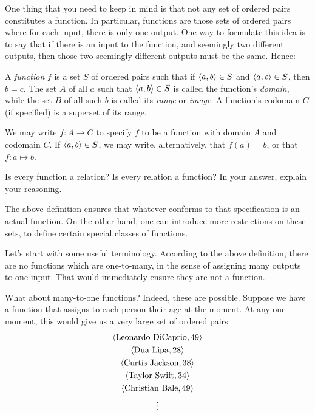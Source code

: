 
One thing that you need to keep in mind is that not any set of ordered pairs constitutes a function. In particular, functions are those sets of ordered pairs where for each input, there is only one output. One way to formulate this idea is to say that if there is an input to the function, and seemingly two different outputs, then those two seemingly different outputs must be the same. Hence:

\begin{defn}[Function] A \emph{function} $f$ is a set $S$ of ordered pairs such that if $\langle a,b\rangle \in S$ and $\langle a, c\rangle \in S$, then $b=c$. The set $A$ of all $a$ such that $\langle a, b\rangle \in S$ is called the function's \emph{domain}, while the set $B$ of all such $b$ is called its \emph{range} or \emph{image}. A function's codomain $C$ (if specified) is a superset of its range. 
	
We may write $f: A \to C$ to specify $f$ to be a function with domain $A$ and codomain $C$. If $\langle a, b\rangle \in S$, we may write, alternatively, that $f(a)=b$, or that $f: a \mapsto b$.   
\end{defn}

\begin{exc}
Is every function a relation? Is every relation a function? In your answer, explain your reasoning. 
\end{exc}


The above definition ensures that whatever conforms to that specification is an actual function. On the other hand, one can introduce more restrictions on these sets, to define certain special classes of functions. 

Let's start with some useful terminology. According to the above definition, there are no functions which are one-to-many, in the sense of assigning many outputs to one input. That would immediately ensure they are not a function. 

What about many-to-one functions? Indeed, these are possible. Suppose we have a function that assigns to each person their age at the moment. At any one moment, this would give us a very large set of ordered pairs:
\begin{gather*}
	\langle\text{Leonardo DiCaprio}, 49\rangle\\
	\langle\text{Dua Lipa}, 28\rangle\\
	\langle\text{Curtis Jackson}, 38\rangle\\
	\langle\text{Taylor Swift}, 34\rangle\\
	\langle\text{Christian Bale}, 49\rangle\\
	\vdots
\end{gather*}

